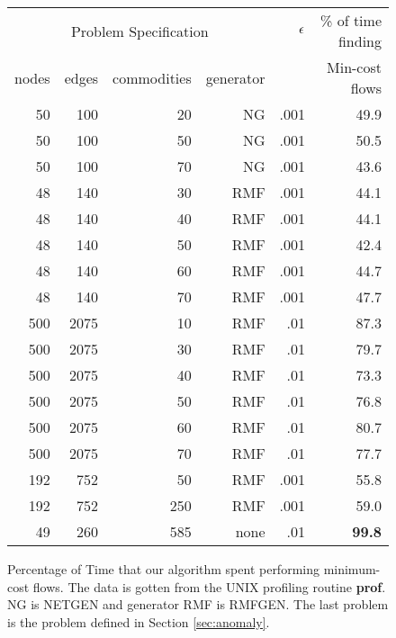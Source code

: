 \begin{figure}
\begin{center}
\begin{tabular}{||r|r|r|r||r|r||} \hline
\multicolumn{4}{||c||}{Problem Specification} & 
	$\epsilon$ & 
	\% of time finding  \\ \cline{1-4}
nodes & edges & commodities & generator &  & Min-cost flows \\
\hline
50 & 100 & 20 & NG & .001 & 49.9 \\
50 & 100 & 50 & NG & .001 & 50.5 \\
50 & 100 & 70 & NG & .001 & 43.6 \\ \hline
48 & 140 & 30 & RMF & .001 & 44.1 \\
48 & 140 & 40 & RMF & .001 & 44.1 \\
48 & 140 & 50 & RMF & .001 & 42.4 \\
48 & 140 & 60 & RMF & .001 & 44.7 \\
48 & 140 & 70 & RMF & .001 & 47.7 \\ \hline
500 & 2075 & 10 & RMF & .01 & 87.3 \\
500 & 2075 & 30 & RMF & .01 & 79.7 \\
500 & 2075 & 40 & RMF & .01 & 73.3 \\
500 & 2075 & 50 & RMF & .01 & 76.8 \\
500 & 2075 & 60 & RMF & .01 & 80.7 \\
500 & 2075 & 70 & RMF & .01 & 77.7 \\ \hline
192 & 752 & 50 & RMF & .001 & 55.8 \\
192 & 752 & 250 & RMF & .001 & 59.0 \\ \hline
49 & 260 & 585 & none & .01 & {\bf 99.8} \\
\hline
\end{tabular}
\end{center}
\caption{Percentage of Time that our algorithm spent performing
minimum-cost flows.  The data is gotten from the UNIX profiling routine
{\bf prof}.
NG is NETGEN and generator RMF is RMFGEN. The last problem is the
problem defined in Section \protect\ref{sec:anomaly}. }
\label{fig:percentage}
\end{figure}

\newcommand{\figinfo}{$x$-axis is \# of iterations.\\
$y$-axis is $\eps$. \\
The top curve is $1/\sqrt{\mbox{\# of iterations}}$. \\
The bottom curve is the minimum $\eps$ achieved. 
}

